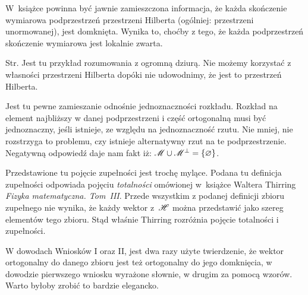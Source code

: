 \documentclass[a4paper,11pt]{article}
\begin{document}
\vspace{0em}



\vspace{0em}


\noindent
W~książce powinna być jawnie zamieszczona informacja, że każda skończenie
wymiarowa podprzestrzeń przestrzeni Hilberta (ogólniej: przestrzeni
unormowanej), jest domknięta. Wynika to, choćby z tego, że każda
podprzestrzeń skończenie wymiarowa jest lokalnie zwarta.

\vspace{\spaceFour}





\noindent
Str. Jest tu przykład rozumowania z ogromną dziurą. Nie możemy
korzystać z własności przestrzeni Hilberta dopóki nie udowodnimy, że
jest to przestrzeń Hilberta.

\vspace{\spaceFour}





\noindent
{} Jest tu pewne zamieszanie odnośnie jednoznaczności
rozkładu. Rozkład na element najbliższy w danej podprzestrzeni i
część ortogonalną musi być jednoznaczny, jeśli istnieje, ze względu
na jednoznaczność rzutu. Nie mniej, nie rozstrzyga to problemu, czy
istnieje alternatywny rzut na te podprzestrzenie. Negatywną odpowiedź
daje nam fakt iż:
$\mathcal{M} \cup \mathcal{M}^{ \bot } = \{ \varnothing \}$.

\vspace{\spaceFour}





\noindent
{} Przedstawione tu pojęcie zupełności jest trochę mylące. Podana tu
definicja zupełności odpowiada pojęciu \textit{totalności} omówionej
w~książce Waltera Thirring \textit{Fizyka matematyczna. Tom~III}. Przede
wszystkim z podanej definicji zbioru zupełnego nie wynika, że każdy wektor
z~$\mathcal{H}$ można przedstawić jako szereg elementów tego zbioru. Stąd właśnie
Thirring rozróżnia pojęcie totalności i zupełności.

\vspace{\spaceFour}





\noindent
{} W dowodach Wniosków I oraz II, jest dwa razy użyte
twierdzenie, że wektor ortogonalny do danego zbioru jest też
ortogonalny do jego domknięcia, w dowodzie pierwszego wniosku
wyrażone słownie, w drugim za pomocą wzorów. Warto byłoby zrobić to
bardzie elegancko.
\end{document}
